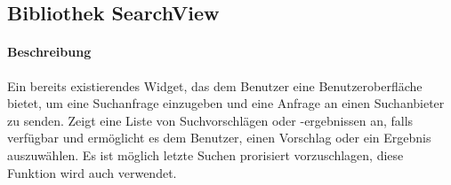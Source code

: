 \subsection{Bibliothek SearchView}
\paragraph*{Beschreibung}
Ein bereits existierendes Widget, das dem Benutzer eine Benutzeroberfläche bietet, um eine Suchanfrage einzugeben und eine Anfrage an einen Suchanbieter zu senden. 
Zeigt eine Liste von Suchvorschlägen oder -ergebnissen an, falls verfügbar 
und ermöglicht es dem Benutzer, einen Vorschlag oder ein Ergebnis auszuwählen.
Es ist möglich letzte Suchen prorisiert vorzuschlagen, diese Funktion wird auch verwendet.
